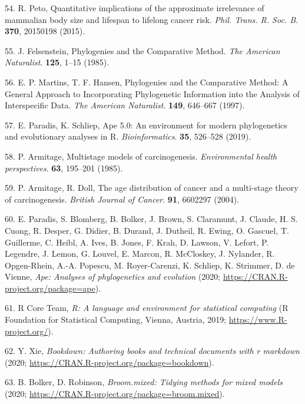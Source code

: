 \documentclass[]{elsarticle} %
\begin{document}
\leavevmode\hypertarget{ref-Peto:20151c2}{}%
54. R. Peto, Quantitative implications of the approximate irrelevance of mammalian body size and lifespan to lifelong cancer risk. \emph{Phil. Trans. R. Soc. B}. \textbf{370}, 20150198 (2015).

\leavevmode\hypertarget{ref-Felsenstein1985}{}%
55. J. Felsenstein, Phylogenies and the Comparative Method. \emph{The American Naturalist}. \textbf{125}, 1--15 (1985).

\leavevmode\hypertarget{ref-MartinsAndHansen1997}{}%
56. E. P. Martins, T. F. Hansen, Phylogenies and the Comparative Method: A General Approach to Incorporating Phylogenetic Information into the Analysis of Interspecific Data. \emph{The American Naturalist}. \textbf{149}, 646--667 (1997).

\leavevmode\hypertarget{ref-ape2019}{}%
57. E. Paradis, K. Schliep, Ape 5.0: An environment for modern phylogenetics and evolutionary analyses in R. \emph{Bioinformatics}. \textbf{35}, 526--528 (2019).

\leavevmode\hypertarget{ref-Armitage:19851c2}{}%
58. P. Armitage, Multistage models of carcinogenesis. \emph{Environmental health perspectives}. \textbf{63}, 195--201 (1985).

\leavevmode\hypertarget{ref-Armitage:20041c2}{}%
59. P. Armitage, R. Doll, The age distribution of cancer and a multi-stage theory of carcinogenesis. \emph{British Journal of Cancer}. \textbf{91}, 6602297 (2004).

\leavevmode\hypertarget{ref-R-ape}{}%
60. E. Paradis, S. Blomberg, B. Bolker, J. Brown, S. Claramunt, J. Claude, H. S. Cuong, R. Desper, G. Didier, B. Durand, J. Dutheil, R. Ewing, O. Gascuel, T. Guillerme, C. Heibl, A. Ives, B. Jones, F. Krah, D. Lawson, V. Lefort, P. Legendre, J. Lemon, G. Louvel, E. Marcon, R. McCloskey, J. Nylander, R. Opgen-Rhein, A.-A. Popescu, M. Royer-Carenzi, K. Schliep, K. Strimmer, D. de Vienne, \emph{Ape: Analyses of phylogenetics and evolution} (2020; \url{https://CRAN.R-project.org/package=ape}).

\leavevmode\hypertarget{ref-R-base}{}%
61. R Core Team, \emph{R: A language and environment for statistical computing} (R Foundation for Statistical Computing, Vienna, Austria, 2019; \url{https://www.R-project.org/}).

\leavevmode\hypertarget{ref-R-bookdown}{}%
62. Y. Xie, \emph{Bookdown: Authoring books and technical documents with r markdown} (2020; \url{https://CRAN.R-project.org/package=bookdown}).

\leavevmode\hypertarget{ref-R-broom.mixed}{}%
63. B. Bolker, D. Robinson, \emph{Broom.mixed: Tidying methods for mixed models} (2020; \url{https://CRAN.R-project.org/package=broom.mixed}).
\end{document}
